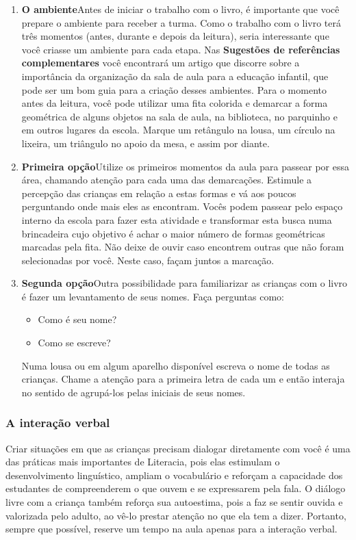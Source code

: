 \documentclass[11pt]{extarticle}
\begin{document}
\begin{enumerate}
\item \textbf{O ambiente}\quad Antes de iniciar o trabalho com o livro, é importante que você 
prepare o ambiente para receber a turma. Como o trabalho com o livro terá 
três momentos (antes, durante e depois da leitura), seria interessante que você 
criasse um ambiente para cada etapa. Nas \textbf{Sugestões de referências complementares} 
você encontrará um artigo que discorre sobre a importância da organização da sala 
de aula para a educação infantil, que pode ser um bom guia para a criação desses 
ambientes. Para o momento antes da leitura, você pode utilizar uma fita colorida
e demarcar a forma geométrica de alguns objetos na sala de aula, na biblioteca,
no parquinho e em outros lugares da escola. Marque um retângulo na lousa, 
um círculo na lixeira, um triângulo no apoio da mesa, e assim por diante. 

\item \textbf{Primeira opção}\quad Utilize os primeiros 
momentos da aula para passear por essa área, chamando atenção para cada uma
das demarcações. Estimule a percepção das crianças em relação a estas formas e
vá aos poucos perguntando onde mais eles as encontram. Vocês podem passear pelo espaço interno
da escola para fazer esta atividade e transformar esta busca numa brincadeira
cujo objetivo é achar o maior número de formas geométricas marcadas pela fita. 
Não deixe de ouvir caso encontrem outras que não foram selecionadas por você.
Neste caso, façam juntos a marcação.
\item \textbf{Segunda opção}\quad Outra possibilidade para familiarizar 
as crianças com o livro é fazer um levantamento de seus nomes. Faça perguntas como:
\begin{itemize}
	\item Como é seu nome? 
	\item Como se escreve?
\end{itemize}
Numa lousa ou em algum aparelho disponível escreva o nome de todas as crianças.
Chame a atenção para a primeira letra de cada um e então interaja no sentido 
de agrupá-los pelas iniciais de seus nomes.

\end{enumerate}


\subsubsection{A interação verbal} 
Criar situações em que as crianças precisam dialogar diretamente com 
você é uma das práticas mais importantes de Literacia, pois elas estimulam 
o desenvolvimento linguístico, ampliam o vocabulário e reforçam a 
capacidade dos estudantes de compreenderem o que ouvem e se expressarem 
pela fala. O diálogo livre com a criança também reforça sua autoestima, pois 
a faz se sentir ouvida e valorizada pelo adulto, ao vê-lo prestar atenção 
no que ela tem a dizer. Portanto, sempre que possível, reserve um tempo na 
aula apenas para a interação verbal. 
\end{document}
